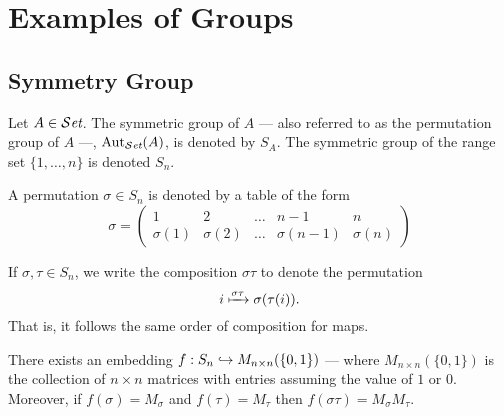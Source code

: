 \section{Examples of Groups}

\subsection{Symmetry Group}

\begin{definition}\label{def: sym-group}
  Let \(A \in {\mathcal{S}\textit{et}}\). The symmetric group of \(A\) --- also referred to as the
  permutation group of \(A\) ---, \(\operatorname{Aut}_{\mathcal{S}\textit{et}}(A)\), is denoted by \(S_A\). The
  symmetric group of the range set \(\{1, \dots, n\}\) is denoted \(S_n\).
\end{definition}

\begin{notation}[Permutations]
  A permutation \(\sigma \in S_n\) is denoted by a table of the form
  \[
    \sigma =
    \begin{pmatrix}
      1 &2 &\dots &n-1 &n \\
      \sigma(1) &\sigma(2) &\dots &\sigma(n-1) &\sigma(n)
    \end{pmatrix}
  \]
\end{notation}

\begin{remark}[Convention]\label{rem: convention-perm}
  If \(\sigma, \tau \in S_n\), we write the composition \(\sigma \tau\)
  to denote the permutation
  \[
    i \xmapsto{\sigma\tau} \sigma(\tau(i)).
  \]
  That is, it follows the same order of composition for maps.
\end{remark}

\begin{proposition}
  There exists an embedding \(f: S_n \hookrightarrow M_{n \times n}(\{0, 1\})\)
  --- where \(M_{n \times n}(\{0, 1\})\) is the collection of \(n \times n\)
  matrices with entries assuming the value of \(1\) or \(0\). Moreover, if
  \(f(\sigma) = M_\sigma\) and \(f(\tau) = M_\tau\) then \(f(\sigma \tau) =
  M_\sigma M_\tau\).
\end{proposition}

